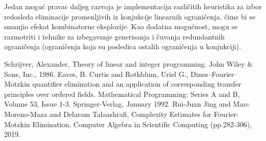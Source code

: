 \documentclass[a4paper,10pt]{article}
\begin{document}
Jedan moguć pravac daljeg razvoja je implementacija različitih heuristika za izbor redosleda eliminacije promenljivih iz konjukcije linearnih ograničenja, čime bi se smanjio efekat kombinatorne eksplozije. Kao dodatna mogućnost, mogu se razmotriti i tehnike za izbegavanje generisanja i čuvanja redundantnih ograničenja (ograničenja koja su posledica ostalih ograničenja u konjukciji).

\begin{thebibliography}{100}
 Schrijver, Alexander, Theory of linear and integer programming. John Wiley \& Sons, Inc., 1986.
 Eaves, B. Curtis and Rothblum, Uriel G., Dines--Fourier--Motzkin quantifier elimination and an application of corresponding transfer principles over ordered fields. Mathematical Programming: Series A and B, Volume 53, Issue 1-3. Springer-Verlag, January 1992.
 Rui-Juan Jing and Marc Moreno-Maza and Delaram Talaashrafi, Complexity Estimates for Fourier-Motzkin Elimination, Computer Algebra in Scientific Computing (pp.282-306), 2019.
\end{thebibliography}
\end{document}
